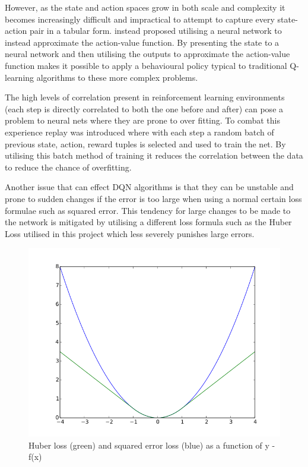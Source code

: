 \documentclass{article}
\begin{document}
However, as the state and action spaces grow in both scale and complexity it becomes increasingly difficult and impractical to attempt to capture every state-action pair in a tabular form.
\citet{Mnih2015} instead proposed utilising a neural network to instead approximate the action-value function.
By presenting the state to a neural network and then utilising the outputs to approximate the action-value function makes it possible to apply a behavioural policy typical to traditional Q-learning algorithms to these more complex problems.

The high levels of correlation present in reinforcement learning environments (each step is directly correlated to both the one before and after) can pose a problem to neural nets where they are prone to over fitting.
To combat this experience replay was introduced where with each step a random batch of previous state, action, reward tuples is selected and used to train the net.
By utilising this batch method of training it reduces the correlation between the data to reduce the chance of overfitting.

Another issue that can effect DQN algorithms is that they can be unstable and prone to sudden changes if the error is too large when using a normal certain loss formulae such as squared error.
This tendency for large changes to be made to the network is mitigated by utilising a different loss formula such as the Huber Loss utilised in this project which less severely punishes large errors.

\begin{figure}[!ht]
  \centering
  \includegraphics[scale=0.3]{Huber_loss.png}
  \caption{Huber loss (green) and squared error loss (blue) as a function of y - f(x) \citep{huber_loss_dia}}
  \label{fig:huber-loss}
\end{figure}
\end{document}
